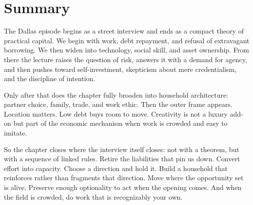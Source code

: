 \section{Summary}

The Dallas episode begins as a street interview and ends as a compact theory of practical capital. We begin with work, debt repayment, and refusal of extravagant borrowing. We then widen into technology, social skill, and asset ownership. From there the lecture raises the question of risk, answers it with a demand for agency, and then pushes toward self-investment, skepticism about mere credentialism, and the discipline of intention.

Only after that does the chapter fully broaden into household architecture: partner choice, family, trade, and work ethic. Then the outer frame appears. Location matters. Low debt buys room to move. Creativity is not a luxury add-on but part of the economic mechanism when work is crowded and easy to imitate.

So the chapter closes where the interview itself closes: not with a theorem, but with a sequence of linked rules. Retire the liabilities that pin us down. Convert effort into capacity. Choose a direction and hold it. Build a household that reinforces rather than fragments that direction. Move where the opportunity set is alive. Preserve enough optionality to act when the opening comes. And when the field is crowded, do work that is recognizably your own.